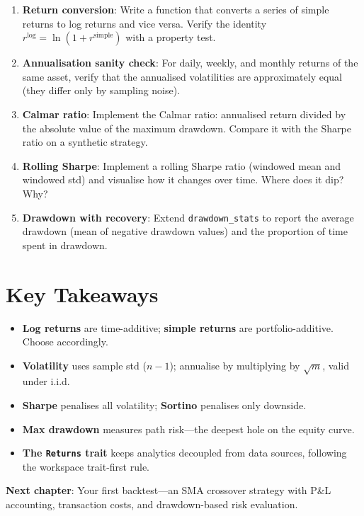 \begin{enumerate}
    \item \textbf{Return conversion}: Write a function that converts a series
      of simple returns to log returns and vice versa. Verify the identity
      $r^{\text{log}} = \ln(1 + r^{\text{simple}})$ with a property test.

    \item \textbf{Annualisation sanity check}: For daily, weekly, and monthly
      returns of the same asset, verify that the annualised volatilities are
      approximately equal (they differ only by sampling noise).

    \item \textbf{Calmar ratio}: Implement the Calmar ratio: annualised return
      divided by the absolute value of the maximum drawdown. Compare it with
      the Sharpe ratio on a synthetic strategy.

    \item \textbf{Rolling Sharpe}: Implement a rolling Sharpe ratio (windowed
      mean and windowed std) and visualise how it changes over time. Where
      does it dip? Why?

    \item \textbf{Drawdown with recovery}: Extend \texttt{drawdown\_stats} to
      report the average drawdown (mean of negative drawdown values) and the
      proportion of time spent in drawdown.
\end{enumerate}

\section{Key Takeaways}

\begin{itemize}
    \item \textbf{Log returns} are time-additive; \textbf{simple returns} are
      portfolio-additive. Choose accordingly.
    \item \textbf{Volatility} uses sample std ($n-1$); annualise by multiplying
      by $\sqrt{m}$, valid under i.i.d.
    \item \textbf{Sharpe} penalises all volatility; \textbf{Sortino} penalises
      only downside.
    \item \textbf{Max drawdown} measures path risk---the deepest hole on the
      equity curve.
    \item \textbf{The \texttt{Returns} trait} keeps analytics decoupled from
      data sources, following the workspace trait-first rule.
\end{itemize}

\vspace{1em}
\noindent\textbf{Next chapter}: Your first backtest---an SMA crossover
strategy with P\&L accounting, transaction costs, and drawdown-based risk
evaluation.